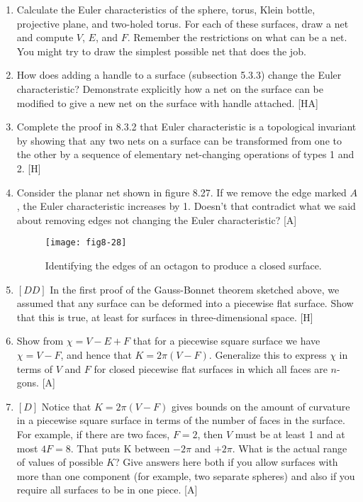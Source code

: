 \documentclass{book}
\begin{document}
\begin{enumerate}
\item Calculate the Euler characteristics of the sphere, torus, Klein bottle,
projective plane, and two-holed torus. For each of these surfaces, draw
a net and compute $V$, $E$, and $F$. Remember the restrictions on what
can be a net. You might try to draw the simplest possible net that does
the job.

\item How does adding a handle to a surface (subsection 5.3.3) change the
Euler characteristic? Demonstrate explicitly how a net on the surface
can be modified to give a new net on the surface with handle attached.
[HA]

\item Complete the proof in 8.3.2 that Euler characteristic is a topological
invariant by showing that any two nets on a surface can be transformed
from one to the other by a sequence of elementary net-changing operations of types 1 and 2. [H]

\item Consider the planar net shown in figure 8.27. If we remove the
edge marked $A$, the Euler characteristic increases by 1. Doesn't that
contradict what we said about removing edges not changing the Euler
characteristic? [A]

\begin{figure}
\begin{center}
\texttt{[image: fig8-28]}
\caption{Identifying the edges of an octagon to produce a closed surface.}
\end{center}
\end{figure}

\item $[DD]$ In the first proof of the Gauss-Bonnet theorem sketched above,
we assumed that any surface can be deformed into a piecewise flat
surface. Show that this is true, at least for surfaces in three-dimensional
space. [H]

\item Show from $\chi = V - E + F$ that for a piecewise square surface we
have $\chi = V - F$, and hence that $K = 2 \pi (V - F)$. Generalize this to
express $\chi$ in terms of $V$ and $F$ for closed piecewise flat surfaces in which
all faces are $n$-gons. [A]

\item $[D]$ Notice that $K = 2 \pi (V - F)$ gives bounds on the amount of
curvature in a piecewise square surface in terms of the number of faces
in the surface. For example, if there are two faces, $F = 2$, then $V$ must
be at least 1 and at most $4F = 8$. That puts K between $-2 \pi$ and $+2 \pi $.
What is the actual range of values of possible $K$? Give answers here
both if you allow surfaces with more than one component (for example,
two separate spheres) and also if you require all surfaces to be in one
piece. [A]


\end{enumerate}
\end{document}
